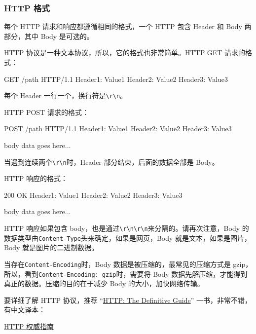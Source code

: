 \hypertarget{http-ux683cux5f0f}{%
\subsubsection{HTTP 格式}\label{http-ux683cux5f0f}}

每个 HTTP 请求和响应都遵循相同的格式，一个 HTTP 包含 Header 和 Body
两部分，其中 Body 是可选的。

HTTP 协议是一种文本协议，所以，它的格式也非常简单。HTTP GET 请求的格式：

\begin{pythoncode}
GET /path HTTP/1.1
Header1: Value1
Header2: Value2
Header3: Value3
\end{pythoncode}

每个 Header
一行一个，换行符是\texttt{\textbackslash{}r\textbackslash{}n}。

HTTP POST 请求的格式：

\begin{pythoncode}
POST /path HTTP/1.1
Header1: Value1
Header2: Value2
Header3: Value3

body data goes here...
\end{pythoncode}

当遇到连续两个\texttt{\textbackslash{}r\textbackslash{}n}时，Header
部分结束，后面的数据全部是 Body。

HTTP 响应的格式：

\begin{pythoncode}
200 OK
Header1: Value1
Header2: Value2
Header3: Value3

body data goes here...
\end{pythoncode}

HTTP 响应如果包含
body，也是通过\texttt{\textbackslash{}r\textbackslash{}n\textbackslash{}r\textbackslash{}n}来分隔的。请再次注意，Body
的数据类型由\texttt{Content-Type}头来确定，如果是网页，Body
就是文本，如果是图片，Body 就是图片的二进制数据。

当存在\texttt{Content-Encoding}时，Body
数据是被压缩的，最常见的压缩方式是
gzip，所以，看到\texttt{Content-Encoding:\ gzip}时，需要将 Body
数据先解压缩，才能得到真正的数据。压缩的目的在于减少 Body
的大小，加快网络传输。

要详细了解 HTTP 协议，推荐
``\href{http://shop.oreilly.com/product/9781565925090.do}{HTTP: The
Definitive Guide}'' 一书，非常不错，有中文译本：

\href{http://t.cn/R7FguRq}{HTTP 权威指南}


